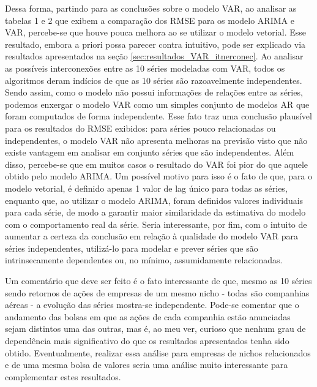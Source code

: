 \documentclass[12pt]{article}
\begin{document}
	Dessa forma, partindo para as conclusões sobre o modelo VAR, ao analisar as tabelas 1 e 2 que exibem a comparação dos RMSE para os modelo ARIMA e VAR, percebe-se que houve pouca melhora ao se utilizar o modelo vetorial. Esse resultado, embora a priori possa parecer contra intuitivo, pode ser explicado via resultados apresentados na seção \ref{sec:resultados_VAR_itnerconec}. Ao analisar as possíveis interconexões entre as 10 séries modeladas com VAR, todos os algoritmos deram indícios de que as 10 séries são razoavelmente independentes. Sendo assim, como o modelo não possui informações de relações entre as séries, podemos enxergar o modelo VAR como um simples conjunto de modelos AR que foram computados de forma independente. Esse fato traz uma conclusão plausível para os resultados do RMSE exibidos: para séries pouco relacionadas ou independentes, o modelo VAR não apresenta melhoras na previsão visto que não existe vantagem em analisar em conjunto séries que são independentes. Além disso, percebe-se que em muitos casos o resultado do VAR foi pior do que aquele obtido pelo modelo ARIMA. Um possível motivo para isso é o fato de que, para o modelo vetorial, é definido apenas 1 valor de \textrm{lag} único para todas as séries, enquanto que, ao utilizar o modelo ARIMA, foram definidos valores individuais para cada série, de modo a garantir maior similaridade da estimativa do modelo com o comportamento real da série. Seria interessante, por fim, com o intuito de aumentar a certeza da conclusão em relação à qualidade do modelo VAR para séries independentes, utilizá-lo para modelar e prever séries que são intrinsecamente dependentes ou, no mínimo, assumidamente relacionadas.
	
	Um comentário que deve ser feito é o fato interessante de que, mesmo as 10 séries sendo retornos de ações de empresas de um mesmo nicho - todas são companhias aéreas - a evolução das séries mostra-se independente. Pode-se comentar que o andamento das bolsas em que as ações de cada companhia estão anunciadas sejam distintos uma das outras, mas é, ao meu ver, curioso que nenhum grau de dependência mais significativo do que os resultados apresentados tenha sido obtido. Eventualmente, realizar essa análise para empresas de nichos relacionados e de uma mesma bolsa de valores seria uma análise muito interessante para complementar estes resultados.
	
\end{document}
